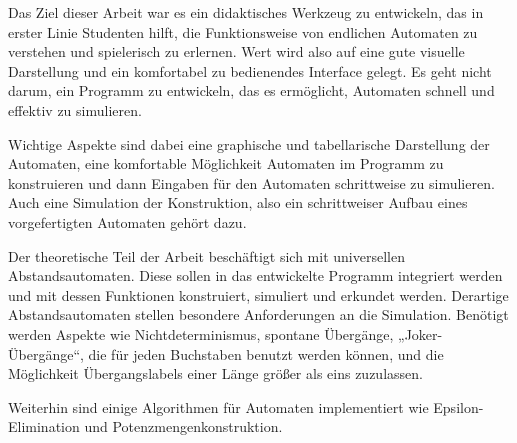 Das Ziel dieser Arbeit war es ein didaktisches Werkzeug zu entwickeln, das in erster Linie Studenten hilft, die Funktionsweise von endlichen Automaten zu verstehen und spielerisch zu erlernen. Wert wird also auf eine gute visuelle Darstellung und ein komfortabel zu bedienendes Interface gelegt. Es geht nicht darum, ein Programm zu entwickeln, das es ermöglicht, Automaten schnell und effektiv zu simulieren.

Wichtige Aspekte sind dabei eine graphische und tabellarische Darstellung der Automaten, eine komfortable Möglichkeit Automaten im Programm zu konstruieren und dann Eingaben für den Automaten schrittweise zu simulieren. Auch eine Simulation der Konstruktion, also ein schrittweiser Aufbau eines vorgefertigten Automaten gehört dazu.

Der theoretische Teil der Arbeit beschäftigt sich mit universellen Abstandsautomaten. Diese sollen in das entwickelte Programm integriert werden und mit dessen Funktionen konstruiert, simuliert und erkundet werden. Derartige Abstandsautomaten stellen besondere Anforderungen an die Simulation. Benötigt werden Aspekte wie Nichtdeterminismus, spontane Übergänge, „Joker-Übergänge“, die für jeden Buchstaben benutzt werden können, und die Möglichkeit Übergangslabels einer Länge größer als eins zuzulassen.

Weiterhin sind einige Algorithmen für Automaten implementiert wie Epsilon-Eli\-mination und Potenzmengenkonstruktion.

\endinput
